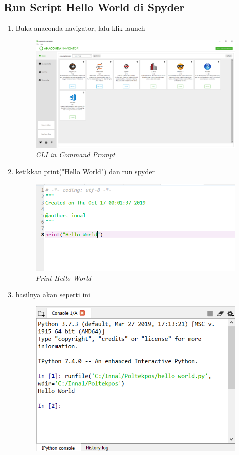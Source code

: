 \subsection{Run Script Hello World di Spyder}
\begin{enumerate}
\item Buka anaconda navigator, lalu klik launch
\begin{figure}[H]
    \centering
    \includegraphics[scale=0.3]{figures/navigator}
    \caption{\textit{CLI in Command Prompt}}
    \label{Anaconda Navigator}
\end{figure}
\item ketikkan print("Hello World") dan run spyder
\begin{figure}[H]
    \centering
    \includegraphics[scale=0.6]{figures/helloworld}
    \caption{\textit{Print Hello World}}
    \label{Print Hello World}
\end{figure}
\item hasilnya akan seperti ini
\begin{figure}[H]
    \centering
    \includegraphics[scale=0.6]{figures/run}

\end{figure}
\end{enumerate}
